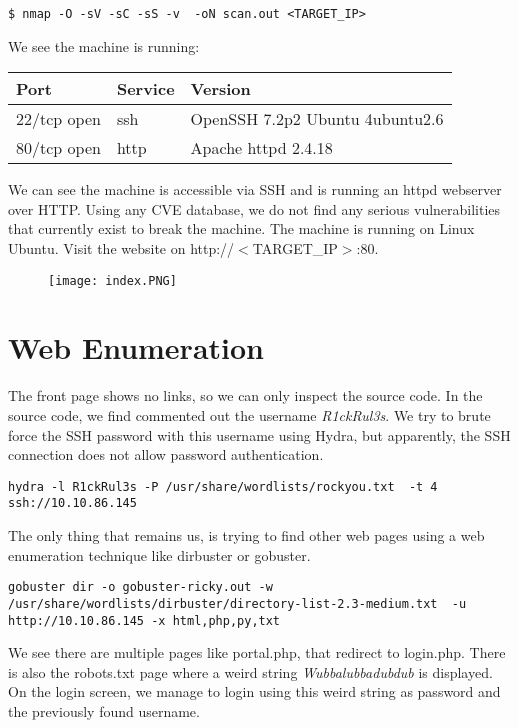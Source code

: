 \documentclass{article}
\begin{document}
\begin{lstlisting}
$ nmap -O -sV -sC -sS -v  -oN scan.out <TARGET_IP>
\end{lstlisting} 

We see the machine is running:

\begin{table}[h]
\begin{tabular}{|l|l|l|}
\hline
\rowcolor[HTML]{9B9B9B} 
\textbf{Port} & \textbf{Service} & \textbf{Version}                                             \\ \hline
22/tcp open  & ssh            & OpenSSH 7.2p2 Ubuntu 4ubuntu2.6                                       \\ \hline
80/tcp open  & http    & Apache httpd 2.4.18                         \\ \hline
\end{tabular}
\end{table}
We can see the machine is accessible via SSH and is running an httpd webserver over HTTP. Using any CVE database, we do not find any serious vulnerabilities that currently exist to break the machine. The machine is running on Linux Ubuntu. Visit the website on http://$<$TARGET\_IP$>$:80.

\begin{figure}[H]
    \texttt{[image: index.PNG]}
\end{figure}

\section{Web Enumeration}
The front page shows no links, so we can only inspect the source code. In the source code, we find commented out the username \textit{R1ckRul3s}. We try to brute force the SSH password with this username using Hydra, but apparently, the SSH connection does not allow password authentication.

\begin{lstlisting}
hydra -l R1ckRul3s -P /usr/share/wordlists/rockyou.txt  -t 4 ssh://10.10.86.145
\end{lstlisting} 

The only thing that remains us, is trying to find other web pages using a web enumeration technique like dirbuster or gobuster.

\begin{lstlisting}
gobuster dir -o gobuster-ricky.out -w /usr/share/wordlists/dirbuster/directory-list-2.3-medium.txt  -u http://10.10.86.145 -x html,php,py,txt 
\end{lstlisting}
We see there are multiple pages like portal.php, that redirect to login.php. There is also the robots.txt page where a weird string \textit{Wubbalubbadubdub} is displayed. On the login screen, we manage to login using this weird string as password and the previously found username. 
\end{document}
